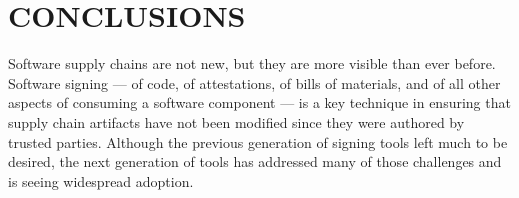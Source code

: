 \documentclass{IEEEcsmagTechrxiv}
\begin{document}
% 
% 
% 
% 
% 

\section{CONCLUSIONS}

Software supply chains are not new, but they are more visible than ever before.
Software signing --- of code, of attestations, of bills of materials, and of all other aspects of consuming a software component --- is a key technique in ensuring that supply chain artifacts have not been modified since they were authored by trusted parties.
Although the previous generation of signing tools left much to be desired, the next generation of tools has addressed many of those challenges and is seeing widespread adoption.
\end{document}
